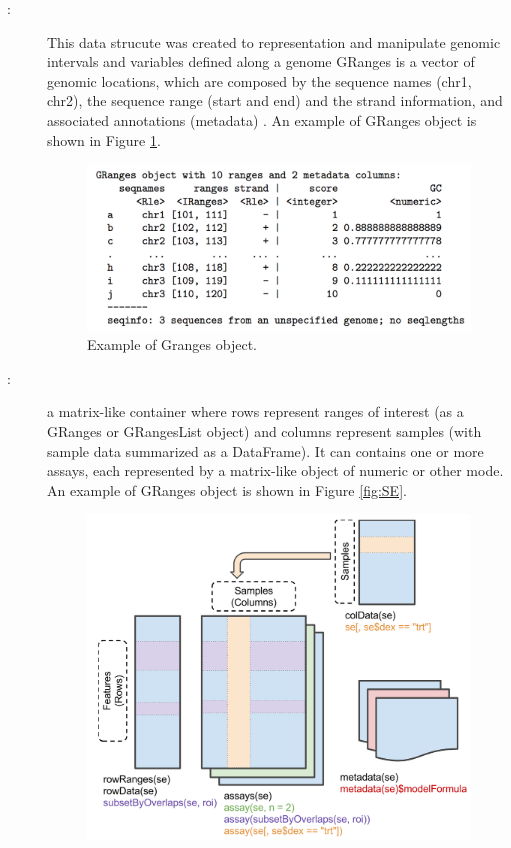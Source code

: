 \begin{description}
  \item [:] This data strucute was created to representation and manipulate genomic intervals and variables defined along a genome
  GRanges is a vector of genomic locations, which are composed by the sequence names (chr1, chr2), the sequence range (start and end) and the strand information, and associated annotations (metadata) \cite{lawrence2013software}. An example of GRanges object is shown in Figure \ref{fig:granges}.

  \begin{figure}[ht!]
  \centering
  \includegraphics[width=1.0\textwidth]{images/Granges.png}
  \caption{\label{fig:granges} Example of Granges object.}
  \end{figure}
  \item [:]  a matrix-like container where rows represent ranges of interest (as a GRanges or GRangesList object) and columns represent samples (with sample data summarized as a DataFrame). It can contains one or more assays, each represented by a matrix-like object of numeric or other mode. An example of GRanges object is shown in Figure \ref{fig:SE}.
  \begin{figure}[ht!]
  \centering
  \includegraphics[width=1.0\textwidth]{images/summarizedExperiment.png}

\end{figure}
\end{description}
